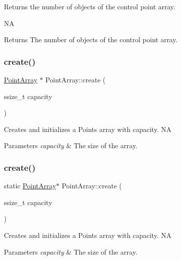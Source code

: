 Returns the number of objects of the control point array.

NA \begin{DoxyReturn}{Returns}
The number of objects of the control point array. 
\end{DoxyReturn}
\mbox{\label{classPointArray_a294489469eb2c96a98e0697a2727ad66}} 
\subsubsection{\texorpdfstring{create()}{create()}\hspace{0.1cm}{\footnotesize\ttfamily [1/2]}}
{\footnotesize\ttfamily \hyperlink{classPointArray}{Point\+Array} $\ast$ Point\+Array\+::create (\begin{DoxyParamCaption}\item[{ssize\+\_\+t}]{capacity }\end{DoxyParamCaption})\hspace{0.3cm}{\ttfamily [static]}}

Creates and initializes a Points array with capacity.  NA 
\begin{DoxyParams}{Parameters}
{\em capacity} & The size of the array. \\
\hline
\end{DoxyParams}
\mbox{\label{classPointArray_aa5c5c280b98b9ca9b8b9cd7d1a36926f}} 
\subsubsection{\texorpdfstring{create()}{create()}\hspace{0.1cm}{\footnotesize\ttfamily [2/2]}}
{\footnotesize\ttfamily static \hyperlink{classPointArray}{Point\+Array}$\ast$ Point\+Array\+::create (\begin{DoxyParamCaption}\item[{ssize\+\_\+t}]{capacity }\end{DoxyParamCaption})\hspace{0.3cm}{\ttfamily [static]}}

Creates and initializes a Points array with capacity.  NA 
\begin{DoxyParams}{Parameters}
{\em capacity} & The size of the array. \\
\hline
\end{DoxyParams}
\mbox{\label{classPointArray_ab9191dfd0c29eb99bb5fa586fc76f72b}} 

